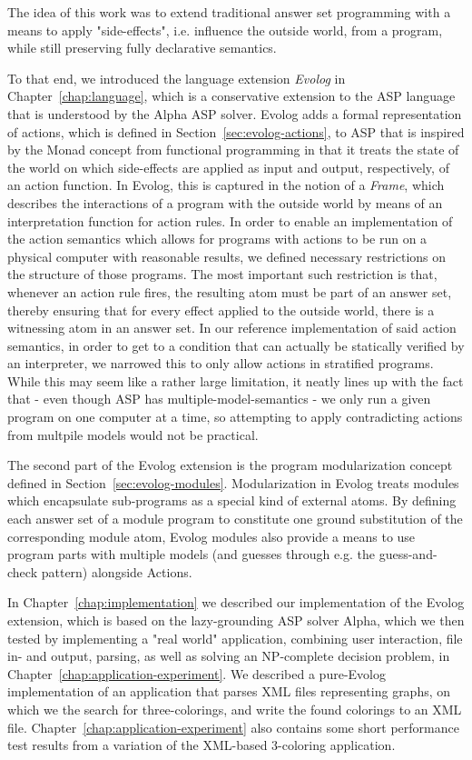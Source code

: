 The idea of this work was to extend traditional answer set programming with a means to apply "side-effects", i.e. influence the outside world, from a program, while still preserving fully declarative semantics. 

To that end, we introduced the language extension \emph{Evolog} in Chapter~\ref{chap:language}, which is a conservative extension to the ASP language that is understood by the Alpha ASP solver. Evolog adds a formal representation of actions, which is defined in Section~\ref{sec:evolog-actions}, to ASP that is inspired by the Monad concept from functional programming in that it treats the state of the world on which side-effects are applied as input and output, respectively, of an action function. In Evolog, this is captured in the notion of a \emph{Frame}, which describes the interactions of a program with the outside world by means of an interpretation function for action rules. In order to enable an implementation of the action semantics which allows for programs with actions to be run on a physical computer with reasonable results, we defined necessary restrictions on the structure of those programs. The most important such restriction is that, whenever an action rule fires, the resulting atom must be part of an answer set, thereby ensuring that for every effect applied to the outside world, there is a witnessing atom in an answer set. In our reference implementation of said action semantics, in order to get to a condition that can actually be statically verified by an interpreter, we narrowed this to only allow actions in stratified programs. While this may seem like a rather large limitation, it neatly lines up with the fact that - even though ASP has multiple-model-semantics - we only run a given program on one computer at a time, so attempting to apply contradicting actions from multpile models would not be practical.

The second part of the Evolog extension is the program modularization concept defined in Section~\ref{sec:evolog-modules}. Modularization in Evolog treats modules which encapsulate sub-programs as a special kind of external atoms. By defining each answer set of a module program to constitute one ground substitution of the corresponding module atom, Evolog modules also provide a means to use program parts with multiple models (and guesses through e.g. the guess-and-check pattern) alongside Actions.

In Chapter~\ref{chap:implementation} we described our implementation of the Evolog extension, which is based on the lazy-grounding ASP solver Alpha, which we then tested by implementing a "real world" application, combining user interaction, file in- and output, parsing, as well as solving an NP-complete decision problem, in Chapter~\ref{chap:application-experiment}. We described a pure-Evolog implementation of an application that parses XML files representing graphs, on which we the search for three-colorings, and write the found colorings to an XML file. Chapter~\ref{chap:application-experiment} also contains some short performance test results from a variation of the XML-based 3-coloring application.

